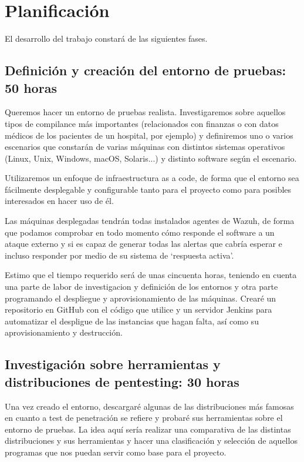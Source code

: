 \section{Planificación}

El desarrollo del trabajo constará de las siguientes fases.

\subsection{Definición y creación del entorno de pruebas: 50 horas}

Queremos hacer un entorno de pruebas realista. Investigaremos sobre aquellos tipos de \gls{compilance} más importantes (relacionados con finanzas o con datos médicos de los pacientes de un hospital, por ejemplo) y definiremos uno o varios escenarios que constarán de varias máquinas con distintos sistemas operativos (Linux, Unix, Windows, macOS, Solaris...) y distinto software según el escenario. 

Utilizaremos un enfoque de infraestructura as a code, de forma que el entorno sea fácilmente desplegable y configurable tanto para el proyecto como para posibles interesados en hacer uso de él. 

Las máquinas desplegadas tendrán todas instalados agentes de Wazuh, de forma que podamos comprobar en todo momento cómo responde el software a un ataque externo y si es capaz de generar todas las alertas que cabría esperar e incluso responder por medio de su sistema de `respuesta activa'.

Estimo que el tiempo requerido será de unas cincuenta horas, teniendo en cuenta una parte de labor de investigacion y definición de los entornos y otra parte programando el despliegue y aprovisionamiento de las máquinas. Crearé un repositorio en GitHub con el código que utilice y un servidor Jenkins para automatizar el despligue de las instancias que hagan falta, así como su aprovisionamiento y destrucción.

\subsection{Investigación sobre herramientas y distribuciones de pentesting: 30 horas}
Una vez creado el entorno, descargaré algunas de las distribuciones más famosas en cuanto a test de penetración se refiere y probaré sus herramientas sobre el entorno de pruebas. La idea aquí sería realizar una comparativa de las distintas distribuciones y sus herramientas y hacer una clasificación y selección de aquellos programas que nos puedan servir como base para el proyecto. 

